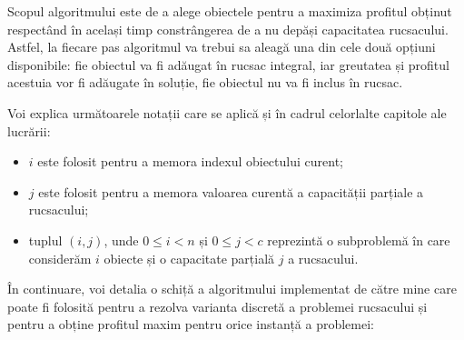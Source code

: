 \begin{sloppypar}
\renewcommand{\labelitemi}{$\rightarrow$}

Scopul algoritmului este de a alege obiectele pentru a maximiza profitul obținut respectând în același timp constrângerea de a nu depăși capacitatea rucsacului. Astfel, la fiecare pas algoritmul va trebui sa aleagă una din cele două opțiuni disponibile: fie obiectul va fi adăugat în rucsac integral, iar greutatea și profitul acestuia vor fi adăugate în soluție, fie obiectul nu va fi inclus în rucsac. \par
Voi explica următoarele notații care se aplică și în cadrul celorlalte capitole ale lucrării:
\begin{itemize}
    \item $i$ este folosit pentru a memora indexul obiectului curent;
    \item $j$ este folosit pentru a memora valoarea curentă a capacității parțiale a rucsacului;
    \item tuplul $(i, j)$, unde $0 \le i < n$ și $0 \le j < c$ reprezintă o subproblemă în care considerăm $i$ obiecte și o capacitate parțială $j$ a rucsacului. 
\end{itemize}  \par

\renewcommand{\labelitemi}{$\bullet$}

În continuare, voi detalia o schiță a algoritmului implementat de către mine care poate fi folosită pentru a rezolva varianta discretă a problemei rucsacului și pentru a obține profitul maxim pentru orice instanță a problemei:


\end{sloppypar}
